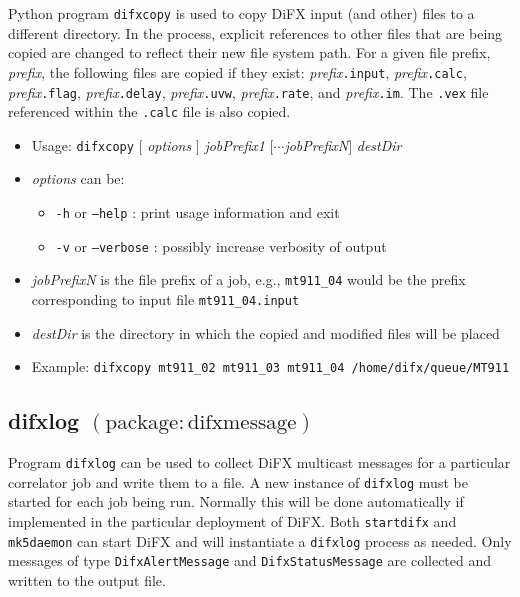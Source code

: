 Python program {\tt difxcopy} is used to copy DiFX input (and other) files to a different directory.
In the process, explicit references to other files that are being copied are changed to reflect their
new file system path.
For a given file prefix, {\em prefix}, the following files are copied if they exist: {\em prefix}{\tt .input}, {\em prefix}{\tt .calc}, {\em prefix}{\tt .flag}, {\em prefix}{\tt .delay}, {\em prefix}{\tt .uvw}, {\em prefix}{\tt .rate}, and {\em prefix}{\tt .im}.
The {\tt .vex} file referenced within the {\tt .calc} file is also copied.

\begin{itemize}
\item[] Usage: {\tt difxcopy} $[$ {\em options} $]$ {\em jobPrefix1} $[\cdots${\em jobPrefixN}$]$ {\em destDir}
\item[] {\em options} can be:
\begin{itemize}
\item[] {\tt -h} or {\tt --help} : print usage information and exit
\item[] {\tt -v} or {\tt --verbose} : possibly increase verbosity of output
\end{itemize}
\item[] {\em jobPrefixN} is the file prefix of a job, e.g., {\tt mt911\_04} would be the prefix corresponding to input file {\tt mt911\_04.input}
\item[] {\em destDir} is the directory in which the copied and modified files will be placed
\item[] Example: {\tt difxcopy mt911\_02 mt911\_03 mt911\_04 /home/difx/queue/MT911}
\end{itemize}











\subsection{difxlog {\small $\mathrm{(package: difxmessage)}$}} \label{sec:difxlogprogram} 

Program {\tt difxlog} can be used to collect DiFX multicast messages for a particular correlator job and write them to a file.
A new instance of {\tt difxlog} must be started for each job being run.
Normally this will be done automatically if implemented in the particular deployment of DiFX.
Both {\tt startdifx} and {\tt mk5daemon} can start DiFX and will instantiate a {\tt difxlog} process as needed.
Only messages of type {\tt DifxAlertMessage} and {\tt DifxStatusMessage} are collected and written to the output file.

